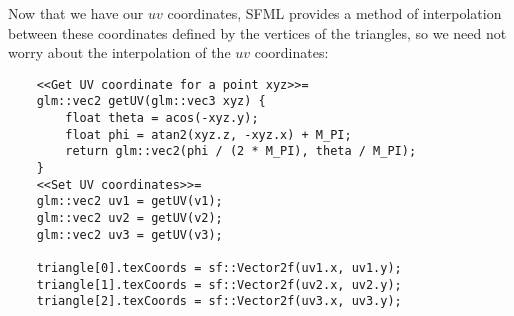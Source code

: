 \documentclass[main.tex]{subfiles}
\begin{document}
Now that we have our $uv$ coordinates, SFML provides a method of interpolation between these coordinates defined by the vertices of the triangles, so 
we need not worry about the interpolation of the $uv$ coordinates:
\begin{lstlisting}
    <<Get UV coordinate for a point xyz>>=
    glm::vec2 getUV(glm::vec3 xyz) {
        float theta = acos(-xyz.y);
        float phi = atan2(xyz.z, -xyz.x) + M_PI;
        return glm::vec2(phi / (2 * M_PI), theta / M_PI);
    }
    <<Set UV coordinates>>=
    glm::vec2 uv1 = getUV(v1);
    glm::vec2 uv2 = getUV(v2);
    glm::vec2 uv3 = getUV(v3);

    triangle[0].texCoords = sf::Vector2f(uv1.x, uv1.y);
    triangle[1].texCoords = sf::Vector2f(uv2.x, uv2.y);
    triangle[2].texCoords = sf::Vector2f(uv3.x, uv3.y);

\end{lstlisting}
\end{document}
